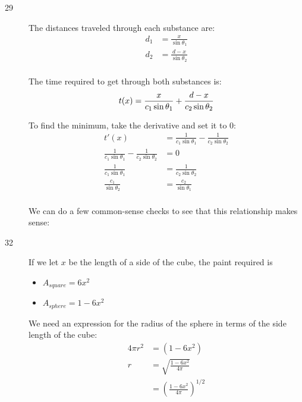 \documentclass[fleqn]{exam}
\begin{document}
\ifprintanswers
\begin{description}

\item[29]
The distances traveled through each substance are:
\begin{align*}
  d_1 &= \frac{x}{\sin \theta_1} \\
  d_2 &= \frac{d - x}{\sin \theta_2} \\
\end{align*}

The time required to get through both substances is:
\[
  t(x) = \frac{x}{c_1 \sin \theta_1} + \frac{d - x}{c_2 \sin \theta_2} \\ 
\]

To find the minimum, take the derivative and set it to 0:
\begin{align*}
  t'(x) &= \frac{1}{c_1 \sin \theta_1} - \frac{1}{c_2 \sin \theta_2} \\ 
  \frac{1}{c_1 \sin \theta_1} - \frac{1}{c_2 \sin \theta_2} &= 0 \\
  \frac{1}{c_1 \sin \theta_1} &= \frac{1}{c_2 \sin \theta_2} \\ 
  \frac{c_1}{\sin \theta_2} &= \frac{c_2}{\sin \theta_1} \\ 
\end{align*}

We can do a few common-sense checks to see that this relationship makes sense:

\pagebreak

\item[32]
If we let $x$ be the length of a side of the cube, the paint required is
\begin{itemize}
\item $A_{square} = 6x^2$
\item $A_{sphere} = 1 - 6x^2$
\end{itemize}

We need an expression for the radius of the sphere in terms of the side length of the cube:
\begin{align*}
  4 \pi r^2 &= (1 - 6x^2) \\
  r &= \sqrt{\frac{1 - 6x^2}{4 \pi}} \\
    &= \left(\frac{1 - 6x^2}{4 \pi} \right)^{1/2} \\
\end{align*}


\end{description}
\end{document}
